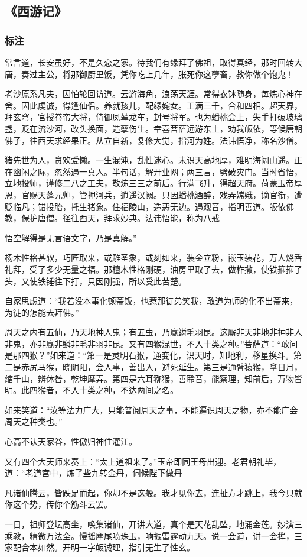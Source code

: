 \subsection{《西游记》}

\subsubsection{标注}
常言道，长安虽好，不是久恋之家。待我们有缘拜了佛祖，取得真经，那时回转大唐，奏过主公，将那御厨里饭，凭你吃上几年，胀死你这孽畜，教你做个饱鬼！

老沙原系凡夫，因怕轮回访道。云游海角，浪荡天涯。常得衣钵随身，每炼心神在舍。因此虔诚，得逢仙侣。养就孩儿，配缘姹女。工满三千，合和四相。超天界，拜玄穹，官授卷帘大将，侍御凤辇龙车，封号将军。也为蟠桃会上，失手打破玻璃盏，贬在流沙河，改头换面，造孽伤生。幸喜菩萨远游东土，劝我皈依，等候唐朝佛子，往西天求经果正。从立自新，复修大觉，指河为姓。法讳悟净，称名沙僧。

猪先世为人，贪欢爱懒。一生混沌，乱性迷心。未识天高地厚，难明海阔山遥。正在幽闲之际，忽然遇一真人。半句话，解开业网；两三言，劈破灾门。当时省悟，立地投师，谨修二八之工夫，敬炼三三之前后。行满飞升，得超天府。荷蒙玉帝厚恩，官赐天蓬元帅，管押河兵，逍遥汉阙。只因蟠桃酒醉，戏弄嫦娥，谪官衔，遭贬临凡；错投胎，托生猪象。住福陵山，造恶无边。遇观音，指明善道。皈依佛教，保护唐僧。径往西天，拜求妙典。法讳悟能，称为八戒

悟空解得是无言语文字，乃是真解。”

杨木性格甚软，巧匠取来，或雕圣象，或刻如来，装金立粉，嵌玉装花，万人烧香礼拜，受了多少无量之福。那檀木性格刚硬，油房里取了去，做柞撒，使铁箍箍了头，又使铁锤往下打，只因刚强，所以受此苦楚。

自家思虑道：“我若没本事化顿斋饭，也惹那徒弟笑我，敢道为师的化不出斋来，为徒的怎能去拜佛。”

周天之内有五仙，乃天地神人鬼；有五虫，乃蠃鳞毛羽昆。这厮非天非地非神非人非鬼，亦非蠃非鳞非毛非羽非昆。又有四猴混世，不入十类之种。”菩萨道：“敢问是那四猴？”如来道：“第一是灵明石猴，通变化，识天时，知地利，移星换斗。第二是赤尻马猴，晓阴阳，会人事，善出入，避死延生。第三是通臂猿猴，拿日月，缩千山，辨休咎，乾坤摩弄。第四是六耳猕猴，善聆音，能察理，知前后，万物皆明。此四猴者，不入十类之种，不达两间之名。

如来笑道：“汝等法力广大，只能普阅周天之事，不能遍识周天之物，亦不能广会周天之种类也。”

心高不认天家眷，性傲归神住灌江。

又有四个大天师来奏上：“太上道祖来了。”玉帝即同王母出迎。老君朝礼毕，道：“老道宫中，炼了些九转金丹，伺候陛下做丹

凡诸仙腾云，皆跌足而起，你却不是这般。我才见你去，连扯方才跳上，我今只就你这个势，传你个筋斗云罢。

一日，祖师登坛高坐，唤集诸仙，开讲大道，真个是天花乱坠，地涌金莲。妙演三乘教，精微万法全。慢摇麈尾喷珠玉，响振雷霆动九天。说一会道，讲一会禅，三家配合本如然。开明一字皈诚理，指引无生了性玄。